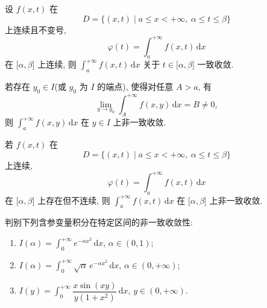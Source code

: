 \begin{theorem}
    设 $f(x,t)$ 在
    \[
        D=\{(x,t)\mid a\leq x<+\infty,\ \alpha\leq t\leq\beta\}
    \]
    上连续且不变号,
    \[
        \varphi(t)=\int_a^{+\infty}f(x,t)\,\mathrm{d}x
    \]
    在 $\lbrack\alpha,\beta\rbrack$ 上连续, 则 $\displaystyle\int_a^{+\infty}f(x,t)\,\mathrm{d}x$ 关于 $t\in\lbrack\alpha,\beta\rbrack$ 一致收敛.
\end{theorem}

\begin{proposition}
    若存在 $y_0\in I$(或 $y_0$ 为 $I$ 的端点), 使得对任意 $A>a$, 有
    \[
        \displaystyle\lim\limits_{y\to y_0}\int_A^{+\infty}f(x,y)\,\mathrm{d}x=B\ne0,
    \]
    则 $\displaystyle\int_a^{+\infty}f(x,y)\,\mathrm{d}x$ 在 $y\in I$ 上非一致收敛.
\end{proposition}

\begin{theorem}[\markstar]
    若 $f(x,t)$ 在
    \[
        D=\{(x,t)\mid a\leq x<+\infty,\ \alpha\leq t\leq\beta\}
    \]
    上连续,
    \[
        \varphi(t)=\int_a^{+\infty}f(x,t)\,\mathrm{d}x
    \]
    在 $\lbrack\alpha,\beta\rbrack$ 上存在但不连续, 则 $\displaystyle\int_a^{+\infty}f(x,t)\,\mathrm{d}x$ 在 $\lbrack\alpha,\beta\rbrack$ 上非一致收敛.
\end{theorem}

\begin{example}
    判别下列含参变量积分在特定区间的非一致收敛性:
    \begin{enumerate}
        \item $\displaystyle I(\alpha)=\int_0^{+\infty}e^{-\alpha x^2}\,\mathrm{d}x$, $\alpha\in(0,1)$;
        \item $\displaystyle I(\alpha)=\int_0^{+\infty}\sqrt{\alpha}\,e^{-\alpha x^2}\,\mathrm{d}x$, $\alpha\in(0,+\infty)$;
        \item $\displaystyle I(y)=\int_0^{+\infty}\dfrac{x\sin(xy)}{y(1+x^2)}\,\mathrm{d}x$, $y\in(0,+\infty)$.
    \end{enumerate}
\end{example}
\exampleblank

